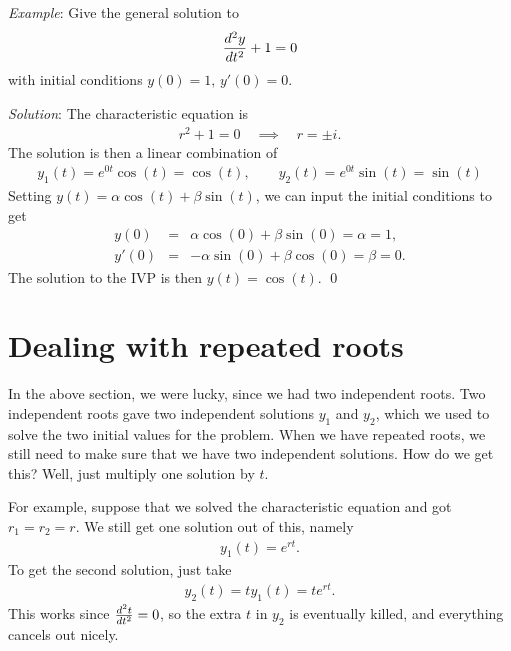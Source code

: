 \documentclass{book}
\begin{document}
\noindent\emph{Example}: Give the general solution to
\begin{align*}
\frac{d^2 y}{d t^2} + 1 =0
\end{align*}
with initial conditions $y(0) =1, \, y'(0) =0.$

\noindent\emph{Solution}:
The characteristic equation is
\begin{align*}
r^2 +1 =0 \quad \implies \quad r = \pm i.
\end{align*}
The solution is then a linear combination of
\begin{align*}
y_1(t) = e^{0t}\cos(t) = \cos(t), \qquad
y_2(t) = e^{0t}\sin(t) = \sin(t)
\end{align*}
Setting $y(t)=\alpha \cos(t) + \beta \sin(t)$, we can input the initial
conditions to get
\begin{align*}
y(0) &=& \alpha\cos(0) + \beta\sin(0) = \alpha =1,
\\
y'(0) &=& -\alpha\sin(0) + \beta\cos(0) =\beta =0.
\end{align*}
The solution to the IVP is then $y(t) = \cos(t)$. \qed

\section{Dealing with repeated roots}
In the above section, we were lucky, since we had two independent roots.
Two independent roots gave two independent solutions $y_1$ and $y_2$, which
we used to solve the two initial values for the problem. When we have
repeated roots, we still need to make sure that we have two independent
solutions. How do we get this? Well, just multiply one solution by $t$.

For example, suppose that we solved the characteristic equation and got
$r_1=r_2=r$. We still get one solution out of this, namely
\begin{align*}
y_1(t) =e^{rt}.
\end{align*}
To get the second solution, just take
\begin{align*}
y_2(t) = t y_1(t) = t e^{rt}.
\end{align*}
This works since $\frac{d^2 t}{d t^2}=0$, so the extra $t$ in $y_2$ is eventually
killed, and everything cancels out nicely.
\end{document}
